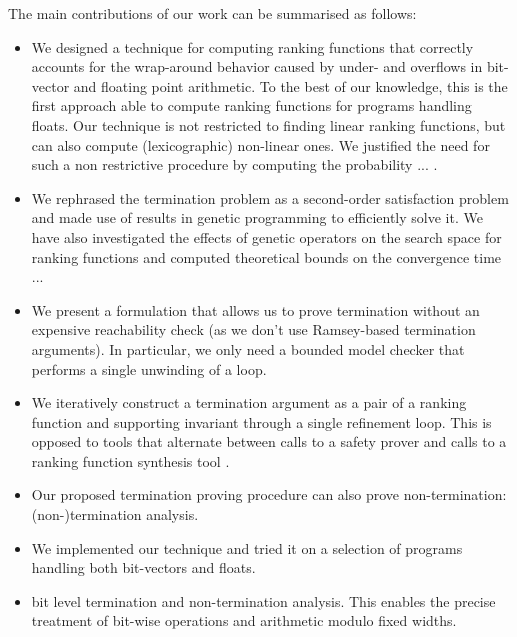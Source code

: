 \documentclass[preprint]{sigplanconf}
\theoremstyle{definition}
\begin{document}


 The main contributions of our work can be summarised as follows:


\begin{itemize}
\item We designed a technique for computing ranking functions that correctly accounts for the wrap-around behavior caused by under- and overflows in bit-vector and floating point arithmetic. To the best of our knowledge, this is the first approach able to compute ranking functions for programs handling floats. Our technique is not restricted to finding linear ranking functions, but can also compute (lexicographic) non-linear  ones. We justified the need for such a non restrictive procedure by computing the probability ... .
\item  We rephrased the termination problem as a second-order satisfaction problem and made 
use of results in genetic programming to efficiently solve it. We have also investigated the effects of genetic operators on the search space for ranking functions and computed theoretical 
bounds on the convergence time ...
\item We present a formulation that allows us to prove termination without an expensive reachability check (as we don't use Ramsey-based termination arguments).  In particular,
we only need a bounded model checker that performs a single unwinding of a loop.

\item We iteratively construct a termination argument as a pair of a ranking function and supporting invariant through a single refinement loop.
This is opposed to tools that alternate between calls to a safety prover and calls to a ranking function synthesis tool \cite{}.

\item Our proposed termination proving procedure can also prove non-termination: (non-)termination analysis.

\item We implemented our technique and tried it on a selection of programs handling both bit-vectors and floats.

\item bit level termination and non-termination analysis. This enables
  the precise treatment of bit-wise operations and arithmetic modulo
  fixed widths.

\end{itemize}
\end{document}
